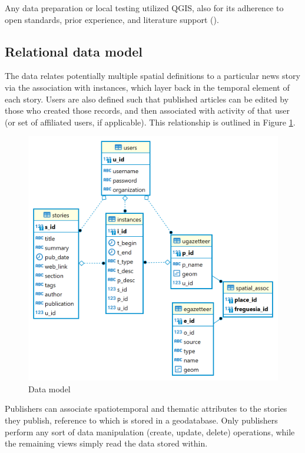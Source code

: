Any data preparation or local testing utilized QGIS, also for its adherence to open standards, prior experience, and literature support (\cite{Sami2019}).

\subsection{Relational data model}
The data relates potentially multiple spatial definitions to a particular news story via the association with instances, which layer back in the temporal element of each story. Users are also defined such that published articles can be edited by those who created those records, and then associated with activity of that user (or set of affiliated users, if applicable). This relationship is outlined in Figure \ref{fig:data_model}.

\begin{figure}[H]
	\centering
	\includegraphics[width=.9\linewidth]{images/db_model.png}
	\caption{Data model}
	\label{fig:data_model}
\end{figure}

Publishers can associate spatiotemporal and thematic attributes to the stories they publish, reference to which is stored in a geodatabase. Only publishers perform any sort of data manipulation (create, update, delete) operations, while the remaining views simply read the data stored within. 

